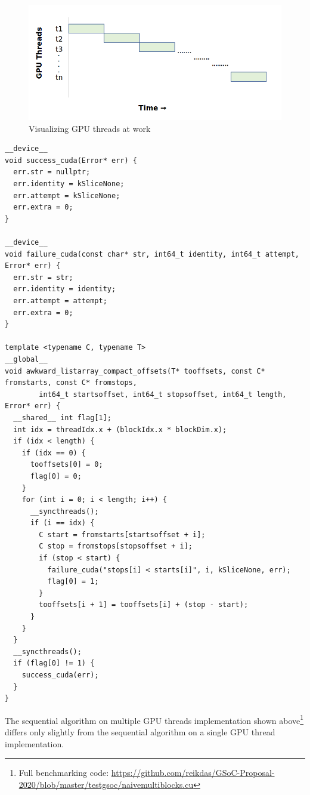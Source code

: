 \documentclass{article}
\begin{document}
\begin{figure}[H]
\includegraphics[width=\textwidth]{Graphics/naivemulti.PNG}
\caption{Visualizing GPU threads at work}
\end{figure}
\begin{mdframed}[backgroundcolor=light-gray, roundcorner=10pt,leftmargin=0.5, rightmargin=0.5, innertopmargin=5,innerbottommargin=5, outerlinewidth=1, linecolor=light-gray]
\begin{verbatim}
__device__
void success_cuda(Error* err) {
  err.str = nullptr;
  err.identity = kSliceNone;
  err.attempt = kSliceNone;
  err.extra = 0;
}

__device__
void failure_cuda(const char* str, int64_t identity, int64_t attempt, Error* err) {
  err.str = str;
  err.identity = identity;
  err.attempt = attempt;
  err.extra = 0;
}

template <typename C, typename T>
__global__
void awkward_listarray_compact_offsets(T* tooffsets, const C* fromstarts, const C* fromstops, 
        int64_t startsoffset, int64_t stopsoffset, int64_t length, Error* err) {
  __shared__ int flag[1];
  int idx = threadIdx.x + (blockIdx.x * blockDim.x);
  if (idx < length) {
    if (idx == 0) {
      tooffsets[0] = 0;
      flag[0] = 0;
    }
    for (int i = 0; i < length; i++) {
      __syncthreads();
      if (i == idx) {
        C start = fromstarts[startsoffset + i];
        C stop = fromstops[stopsoffset + i];
        if (stop < start) {
          failure_cuda("stops[i] < starts[i]", i, kSliceNone, err);
          flag[0] = 1;
        }
        tooffsets[i + 1] = tooffsets[i] + (stop - start);
      }
    }
  }
  __syncthreads();
  if (flag[0] != 1) {
    success_cuda(err);
  }
}

\end{verbatim}
\end{mdframed}
The sequential algorithm on multiple GPU threads implementation shown above\footnote{Full benchmarking code: \url{https://github.com/reikdas/GSoC-Proposal-2020/blob/master/testgsoc/naivemultiblocks.cu}} differs only slightly from the sequential algorithm on a single GPU thread implementation.
\end{document}
